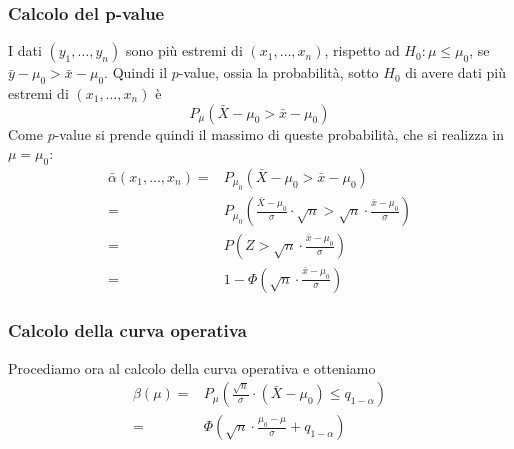 \subsubsection{Calcolo del p-value}
I dati $(y_1, \dots, y_n)$ sono più estremi di $(x_1, \dots, x_n)$, rispetto ad
$H_0: \mu \leq \mu_0$, se $\bar{y} - \mu_0 > \bar{x} - \mu_0$. Quindi il $p$-value,
ossia la probabilità, sotto $H_0$ di avere dati più estremi di $(x_1, \dots, x_n)$ è
\[ P_\mu \left( \bar{X} - \mu_0 > \bar{x} - \mu_0 \right) \]
Come $p$-value si prende quindi il massimo di queste probabilità, che si realizza in $\mu = \mu_0$:
\begin{align*}
	\bar{\alpha} (x_1, \dots, x_n)
	= & P_{\mu_0} \left( \bar{X} - \mu_0 > \bar{x} - \mu_0 \right)            \\
	= & P_{\mu_0} \left( \frac{\bar{X} - \mu_0}{\sigma} \cdot \sqrt{n} >
	\sqrt{n} \cdot \frac{\bar{x} - \mu_0}{\sigma} \right)                     \\
	= & P \left( Z > \sqrt{n} \cdot \frac{\bar{x} - \mu_0}{\sigma} \right)    \\
	= & 1 - \Phi \left( \sqrt{n} \cdot \frac{\bar{x} - \mu_0}{\sigma} \right)
\end{align*}

\subsubsection{Calcolo della curva operativa}
Procediamo ora al calcolo della curva operativa e otteniamo
\begin{align*}
	\beta(\mu) = & P_\mu \left( \frac{\sqrt{n}}{\sigma} \cdot (\bar{X} - \mu_0) \leq
	q_{1-\alpha} \right)                                                                        \\
	=            & \Phi \left( \sqrt{n} \cdot \frac{\mu_0 - \mu}{\sigma} + q_{1-\alpha} \right)
\end{align*}